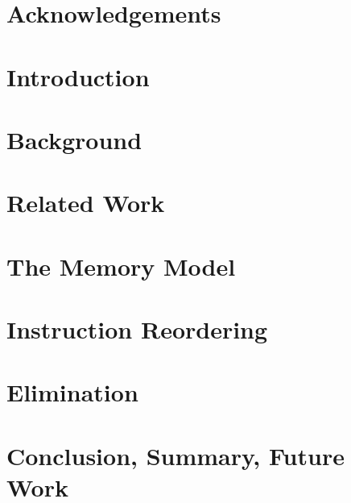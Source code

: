 \documentclass[12pt, TexShade, letterpaper]{report}
\begin{document}
\chapter*{Acknowledgements}
	\label{chap:acknowledgments}


 \tableofcontents\thispagestyle{plain}

 \listoffigures\thispagestyle{plain}
 \listoftables

  \clearpage

    \chapter{Introduction}
    

    \chapter{Background}

    \chapter{Related Work}

    \chapter{The Memory Model}
    

    \chapter{Instruction Reordering}
    

    \chapter{Elimination} 
    

    \chapter{Conclusion, Summary, Future Work}
    
\end{document}
